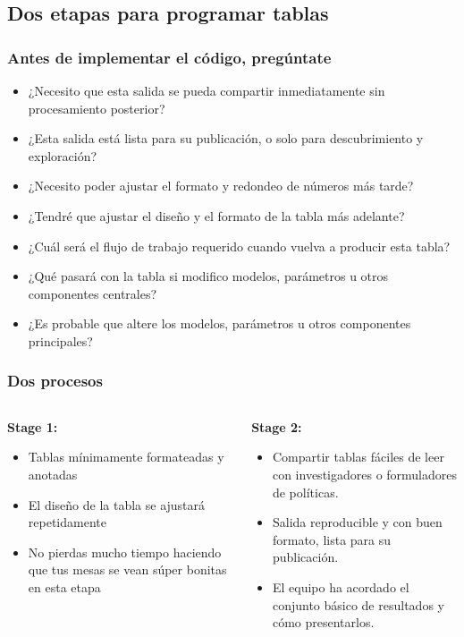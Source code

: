 \documentclass[10pt, aspectratio=169, compress]{beamer}
\begin{document}
\subsection{Dos etapas para programar tablas}
\begin{frame}[t]
	\frametitle{Antes de implementar el código, pregúntate}

	\begin{itemize}[<+->]
		\item ¿Necesito que esta salida se pueda compartir inmediatamente sin procesamiento posterior?
		\item ¿Esta salida está lista para su publicación, o solo para descubrimiento y exploración?
		\item ¿Necesito poder ajustar el formato y redondeo de números más tarde?
		\item ¿Tendré que ajustar el diseño y el formato de la tabla más adelante?
		\item ¿Cuál será el flujo de trabajo requerido cuando vuelva a producir esta tabla?
		\item ¿Qué pasará con la tabla si modifico modelos, parámetros u otros componentes centrales?
		\item ¿Es probable que altere los modelos, parámetros u otros componentes principales?
	\end{itemize}
\end{frame}
\begin{frame}
	\frametitle{Dos procesos}

	\begin{columns}
		\begin{column}[t]{0.5\textwidth}
			\textbf{Stage 1:} 
			\begin{itemize}
				\item Tablas mínimamente formateadas y anotadas
				\item El diseño de la tabla se ajustará repetidamente
				\item No pierdas mucho tiempo haciendo que tus mesas se vean súper bonitas en esta etapa
			\end{itemize}
		\end{column}
		\begin{column}[t]{0.5\textwidth}  %
			\textbf{Stage 2:} 
			\begin{itemize}
				\item Compartir tablas fáciles de leer con investigadores o formuladores de políticas.
				\item Salida reproducible y con buen formato, lista para su publicación.
				\item El equipo ha acordado el conjunto básico de resultados y cómo presentarlos.
			\end{itemize}
		\end{column}
	\end{columns}

\end{frame}
\end{document}
